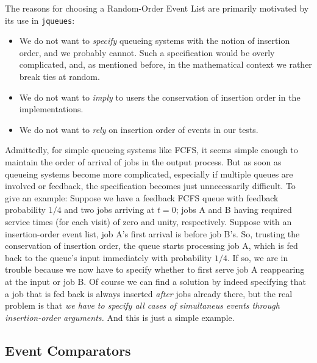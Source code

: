 \documentclass[12pt]{book}
\begin{document}
The reasons for choosing a Random-Order Event List are
  primarily motivated by its use in \lstinline|jqueues|:
\begin{itemize}
  \item We do not want to {\em specify\/} queueing systems with the notion of
          insertion order, and we probably cannot.
        Such a specification would be overly complicated, and, as mentioned before,
          in the mathematical context we rather break ties at random.
  \item We do not want to {\em imply\/} to users the conservation of insertion order
          in the implementations.
  \item We do not want to {\em rely\/} on insertion order of events in our tests.
\end{itemize}

Admittedly, for simple queueing systems like FCFS,
  it seems simple enough to maintain the order of arrival of jobs
  in the output process.
But as soon as queueing systems become more complicated,
  especially if multiple queues are involved or feedback,
  the specification becomes just unnecessarily difficult.
To give an example: Suppose we have a feedback FCFS queue with
  feedback probability $1/4$ and two jobs arriving at $t=0$;
  jobs A and B having required service times (for each visit)
  of zero and unity, respectively.
Suppose with an insertion-order event list, job A's first
  arrival is before job B's.
So, trusting the conservation of insertion order,
  the queue starts processing job A,
  which is fed back to the queue's input immediately
  with probability $1/4$.
If so, we are in trouble because we now have to specify
  whether to first serve job A reappearing at the input
  or job B.
Of course we can find a solution by indeed specifying that
  a job that is fed back is always inserted {\em after\/} jobs
  already there, but the real problem is that
  {\em we have to specify all cases of simultaneus events through
  insertion-order arguments.}
And this is just a simple example.

\subsection{Event Comparators}
\end{document}
